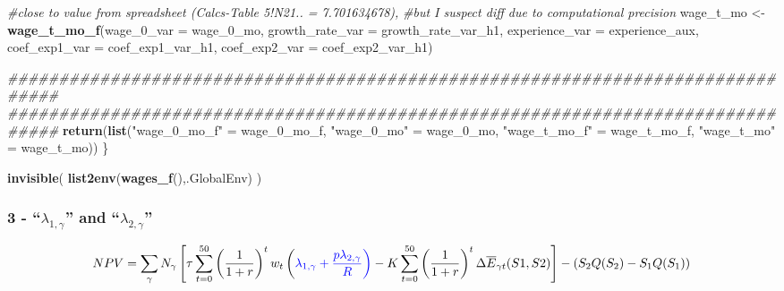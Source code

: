 \documentclass[]{article}
\newenvironment{Shaded}{\begin{snugshade}}{\end{snugshade}}
\newcommand{\CommentTok}[1]{\textcolor[rgb]{0.56,0.35,0.01}{\textit{#1}}}
\newcommand{\DataTypeTok}[1]{\textcolor[rgb]{0.13,0.29,0.53}{#1}}
\newcommand{\DecValTok}[1]{\textcolor[rgb]{0.00,0.00,0.81}{#1}}
\newcommand{\KeywordTok}[1]{\textcolor[rgb]{0.13,0.29,0.53}{\textbf{#1}}}
\newcommand{\NormalTok}[1]{#1}
\newcommand{\StringTok}[1]{\textcolor[rgb]{0.31,0.60,0.02}{#1}}
\begin{document}
\begin{Shaded}
\begin{Highlighting}[]
    \CommentTok{#close to value from spreadsheet (Calcs-Table 5!N21.. = 7.701634678),}
    \CommentTok{#but I suspect diff due to computational precision}
\NormalTok{    wage_t_mo <-}\StringTok{ }\KeywordTok{wage_t_mo_f}\NormalTok{(}\DataTypeTok{wage_0_var =}\NormalTok{ wage_}\DecValTok{0}\NormalTok{_mo,}
                       \DataTypeTok{growth_rate_var =}\NormalTok{ growth_rate_var_h1,}
                       \DataTypeTok{experience_var =}\NormalTok{ experience_aux,}
                       \DataTypeTok{coef_exp1_var =}\NormalTok{ coef_exp1_var_h1,}
                       \DataTypeTok{coef_exp2_var =}\NormalTok{ coef_exp2_var_h1)}

\CommentTok{################################################################################}
\CommentTok{################################################################################}
    \KeywordTok{return}\NormalTok{(}\KeywordTok{list}\NormalTok{(}\StringTok{"wage_0_mo_f"}\NormalTok{ =}\StringTok{ }\NormalTok{wage_}\DecValTok{0}\NormalTok{_mo_f, }\StringTok{"wage_0_mo"}\NormalTok{ =}\StringTok{ }\NormalTok{wage_}\DecValTok{0}\NormalTok{_mo, }
                \StringTok{"wage_t_mo_f"}\NormalTok{ =}\StringTok{ }\NormalTok{wage_t_mo_f, }\StringTok{"wage_t_mo"}\NormalTok{ =}\StringTok{ }\NormalTok{wage_t_mo))}
\NormalTok{\}}

\KeywordTok{invisible}\NormalTok{( }\KeywordTok{list2env}\NormalTok{(}\KeywordTok{wages_f}\NormalTok{(),.GlobalEnv) )}
\end{Highlighting}
\end{Shaded}

\hypertarget{lambda_1gamma-and-lambda_2gamma}{%
\subsubsection{\texorpdfstring{3 - ``\(\lambda_{1,\gamma}\)'' and
``\(\lambda_{2,\gamma}\)''}{3 - ``\textbackslash{}lambda\_\{1,\textbackslash{}gamma\}'' and ``\textbackslash{}lambda\_\{2,\textbackslash{}gamma\}''}}\label{lambda_1gamma-and-lambda_2gamma}}

\begin{equation}
NPV =  \sum_{\gamma} N_{\gamma} \left[
\tau \sum_{t=0}^{50}\left(  \frac{1}{1 + r}\right)^{t} w_{t}
\left(\color{blue}{ \lambda_{1, \gamma} } + \frac{p \color{blue}{\lambda_{2, \gamma}}}{R} \right) -
K \sum_{t=0}^{50} \left( \frac{1}{1 + r}\right)^{t} \Delta \overline{E}_{\gamma t}(S1,S2)
\right] - \left( S_{2}Q(S_{2}) - S_{1}Q(S_{1}) \right)
\end{equation}
\end{document}
